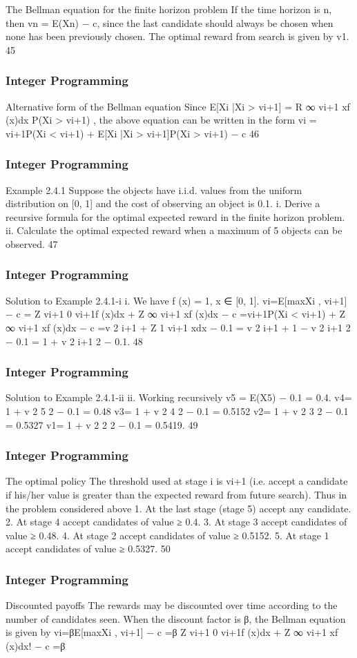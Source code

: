 \begin{frame}
The Bellman equation for the finite horizon problem
If the time horizon is n, then vn = E(Xn) − c, since the last
candidate should always be chosen when none has been previously
chosen.
The optimal reward from search is given by v1.
45 \end{frame}  \begin{frame} \frametitle{Integer Programming}     
Alternative form of the Bellman equation
Since
E[Xi
|Xi > vi+1] =
R ∞
vi+1
xf (x)dx
P(Xi > vi+1)
,
the above equation can be written in the form
vi = vi+1P(Xi < vi+1) + E[Xi
|Xi > vi+1]P(Xi > vi+1) − c
46 \end{frame}  \begin{frame} \frametitle{Integer Programming}     
Example 2.4.1
Suppose the objects have i.i.d. values from the uniform
distribution on [0, 1] and the cost of observing an object is 0.1.
i. Derive a recursive formula for the optimal expected
reward in the finite horizon problem.
ii. Calculate the optimal expected reward when a
maximum of 5 objects can be observed.
47 \end{frame}  \begin{frame} \frametitle{Integer Programming}     
Solution to Example 2.4.1-i
i. We have f (x) = 1, x ∈ [0, 1].
vi=E[max{Xi
, vi+1}] − c
=
Z vi+1
0
vi+1f (x)dx +
Z ∞
vi+1
xf (x)dx − c
=vi+1P(Xi < vi+1) + Z ∞
vi+1
xf (x)dx − c
=v
2
i+1 +
Z 1
vi+1
xdx − 0.1 = v
2
i+1 +
1 − v
2
i+1
2
− 0.1
=
1 + v
2
i+1
2
− 0.1.
48 \end{frame}  \begin{frame} \frametitle{Integer Programming}     
Solution to Example 2.4.1-ii
ii. Working recursively v5 = E(X5) − 0.1 = 0.4.
v4=
1 + v
2
5
2
− 0.1 = 0.48
v3=
1 + v
2
4
2
− 0.1 = 0.5152
v2=
1 + v
2
3
2
− 0.1 = 0.5327
v1=
1 + v
2
2
2
− 0.1 = 0.5419.
49 \end{frame}  \begin{frame} \frametitle{Integer Programming}     
The optimal policy
The threshold used at stage i is vi+1 (i.e. accept a candidate if
his/her value is greater than the expected reward from future
search).
Thus in the problem considered above
1. At the last stage (stage 5) accept any candidate.
2. At stage 4 accept candidates of value ≥ 0.4.
3. At stage 3 accept candidates of value ≥ 0.48.
4. At stage 2 accept candidates of value ≥ 0.5152.
5. At stage 1 accept candidates of value ≥ 0.5327.
50 \end{frame}  \begin{frame} \frametitle{Integer Programming}     
Discounted payoffs
The rewards may be discounted over time according to the number
of candidates seen. When the discount factor is β, the Bellman
equation is given by
vi=βE[max{Xi
, vi+1}] − c
=β
 Z vi+1
0
vi+1f (x)dx +
Z ∞
vi+1
xf (x)dx!
− c
=β


\end{frame}
